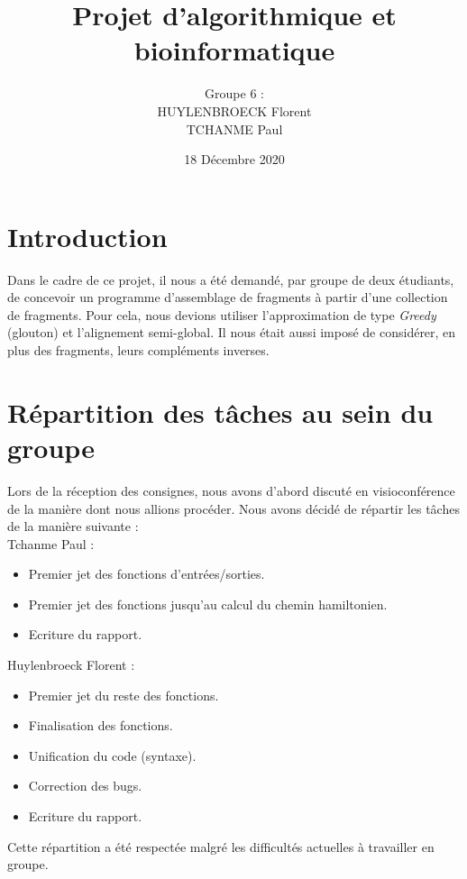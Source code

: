 \documentclass[11pt]{article}
\begin{document}
\title{\huge Projet d'algorithmique et bioinformatique}
\author{Groupe 6 :\\
HUYLENBROECK Florent\\
TCHANME Paul}
\date{18 Décembre 2020}
\maketitle
\newpage
\section{Introduction}
Dans le cadre de ce projet, il nous a été demandé, par groupe de deux étudiants, de concevoir un programme d'assemblage de fragments à partir d'une collection de fragments.
Pour cela, nous devions utiliser l'approximation de type \emph{Greedy} (glouton) et l'alignement semi-global. Il nous était aussi imposé de considérer, en plus des fragments, leurs compléments inverses.
\section{Répartition des tâches au sein du groupe}
Lors de la réception des consignes, nous avons d'abord discuté en visioconférence de la manière dont nous allions procéder. Nous avons décidé de répartir les tâches de la manière suivante :\\[.5cm]
Tchanme Paul :
\begin{itemize}
	\item Premier jet des fonctions d'entrées/sorties.
	\item Premier jet des fonctions jusqu'au calcul du chemin hamiltonien.
	\item Ecriture du rapport.
\end{itemize}
Huylenbroeck Florent :
\begin{itemize}
	\item Premier jet du reste des fonctions.
	\item Finalisation des fonctions.
	\item Unification du code (syntaxe).
	\item Correction des bugs.
	\item Ecriture du rapport.
\end{itemize}
Cette répartition a été respectée malgré les difficultés actuelles à travailler en groupe.
\newpage
\end{document}
